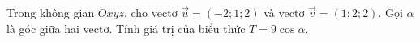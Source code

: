\begin{ex}
Trong không gian $Oxyz$, cho vectơ $\vec{u}=(-2;1;2)$ và vectơ $\vec{v}=(1;2;2)$. Gọi $\alpha$ là góc giữa hai vectơ. Tính giá trị của biểu thức $T=9\cos\alpha$.
\end{ex}
